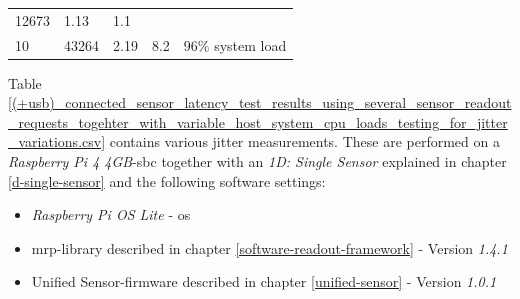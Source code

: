 \begin{longtable}[]{@{}lllll@{}}
\begin{minipage}[t]{0.11\columnwidth}
12673\strut
\end{minipage} & \begin{minipage}[t]{0.35\columnwidth}\raggedright
1.13\strut
\end{minipage} & \begin{minipage}[t]{0.22\columnwidth}\raggedright
1.1\strut
\end{minipage} & \begin{minipage}[t]{0.10\columnwidth}\raggedright
\strut
\end{minipage}\tabularnewline
\begin{minipage}[t]{0.08\columnwidth}\raggedright
10\strut
\end{minipage} & \begin{minipage}[t]{0.11\columnwidth}\raggedright
43264\strut
\end{minipage} & \begin{minipage}[t]{0.35\columnwidth}\raggedright
2.19\strut
\end{minipage} & \begin{minipage}[t]{0.22\columnwidth}\raggedright
8.2\strut
\end{minipage} & \begin{minipage}[t]{0.10\columnwidth}\raggedright
96\% system load\strut
\end{minipage}\tabularnewline
\bottomrule
\end{longtable}

Table
\ref{(+usb)_connected_sensor_latency_test_results_using_several_sensor_readout_requests_togehter_with_variable_host_system_cpu_loads_testing_for_jitter_variations.csv}
contains various jitter measurements. These are performed on a
\emph{Raspberry Pi 4 4GB}-\gls{sbc} together with an \emph{1D: Single
Sensor} explained in chapter \ref{d-single-sensor} and the following
software settings:

\begin{itemize}
\tightlist
\item
  \emph{Raspberry Pi OS Lite} - \gls{os}
\item
  \gls{mrp}-library described in chapter
  \ref{software-readout-framework} - Version \emph{1.4.1}
\item
  Unified Sensor-firmware described in chapter \ref{unified-sensor} -
  Version \emph{1.0.1}
\end{itemize}

